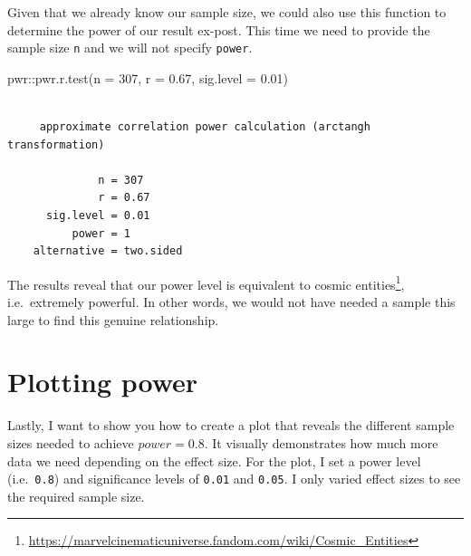 \documentclass[
  letterpaper,
]{krantz}
\makeatletter
\newenvironment{Shaded}{\begin{snugshade}}{\end{snugshade}}
\newcommand{\AttributeTok}[1]{\textcolor[rgb]{0.40,0.45,0.13}{#1}}
\newcommand{\DecValTok}[1]{\textcolor[rgb]{0.68,0.00,0.00}{#1}}
\newcommand{\FloatTok}[1]{\textcolor[rgb]{0.68,0.00,0.00}{#1}}
\newcommand{\FunctionTok}[1]{\textcolor[rgb]{0.28,0.35,0.67}{#1}}
\newcommand{\NormalTok}[1]{\textcolor[rgb]{0.00,0.23,0.31}{#1}}
\newcommand{\SpecialCharTok}[1]{\textcolor[rgb]{0.37,0.37,0.37}{#1}}
\renewcommand{\href}[2]{#2\footnote{\url{#1}}}
\newenvironment{kframe}{%
\medskip{}
\setlength{\fboxsep}{.8em}
 \def\at@end@of@kframe{}%
 \ifinner\ifhmode%
  \def\at@end@of@kframe{\end{minipage}}%
  \begin{minipage}{\columnwidth}%
 \fi\fi%
 \def\FrameCommand##1{\hskip\@totalleftmargin \hskip-\fboxsep
 \colorbox{shadecolor}{##1}\hskip-\fboxsep
     \hskip-\linewidth \hskip-\@totalleftmargin \hskip\columnwidth}%
 \MakeFramed {\advance\hsize-\width
   \@totalleftmargin\z@ \linewidth\hsize
   \@setminipage}}%
 {\par\unskip\endMakeFramed%
 \at@end@of@kframe}
\renewenvironment{Shaded}{\begin{kframe}}{\end{kframe}}
\makeatother
\begin{document}
Given that we already know our sample size, we could also use this
function to determine the power of our result ex-post. This time we need
to provide the sample size \texttt{n} and we will not specify
\texttt{power}.

\begin{Shaded}
\begin{Highlighting}[]
\NormalTok{pwr}\SpecialCharTok{::}\FunctionTok{pwr.r.test}\NormalTok{(}\AttributeTok{n =} \DecValTok{307}\NormalTok{,}
                \AttributeTok{r =} \FloatTok{0.67}\NormalTok{,}
                \AttributeTok{sig.level =} \FloatTok{0.01}\NormalTok{)}
\end{Highlighting}
\end{Shaded}

\begin{verbatim}

     approximate correlation power calculation (arctangh transformation) 

              n = 307
              r = 0.67
      sig.level = 0.01
          power = 1
    alternative = two.sided
\end{verbatim}

The results reveal that our power level is equivalent to
\href{https://marvelcinematicuniverse.fandom.com/wiki/Cosmic_Entities}{cosmic
entities}, i.e.~extremely powerful. In other words, we would not have
needed a sample this large to find this genuine relationship.

\section{Plotting power}\label{sec-plotting-power}

Lastly, I want to show you how to create a plot that reveals the
different sample sizes needed to achieve \(power = 0.8\). It visually
demonstrates how much more data we need depending on the effect size.
For the plot, I set a power level (i.e.~\texttt{0.8}) and significance
levels of \texttt{0.01} and \texttt{0.05}. I only varied effect sizes to
see the required sample size.
\end{document}
